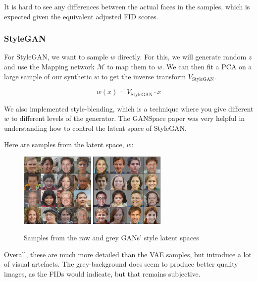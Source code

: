 \documentclass{article}
\begin{document}
It is hard to see any differences between the actual faces in the samples, which is expected given the equivalent adjusted FID scores.

\subsubsection*{StyleGAN}

For StyleGAN, we want to sample $w$ directly. For this, we will generate random $z$ and use the Mapping network $\mathcal{M}$ to map them to $w$.
We can then fit a PCA on a large sample of our synthetic $w$ to get the inverse transform $V_{\text{StyleGAN}}$.

\[w(x) = V_{\text{StyleGAN}} \cdot x\]

We also implemented style-blending, which is a technique where you give different $w$ to different levels of the generator.
The GANSpace paper \cite{harkonen2020ganspace} was very helpful in understanding how to control the latent space of StyleGAN.

Here are samples from the latent space, $w$:

\begin{figure}[H]
  \centering
  \includegraphics[width=0.32\textwidth]{images/sample_gan_raw.png}
  \includegraphics[width=0.32\textwidth]{images/sample_gan_grey.png}
  \caption{Samples from the raw and grey GANs' style latent spaces}
\end{figure}

Overall, these are much more detailed than the VAE samples, but introduce a lot of visual artefacts. 
The grey-background does seem to produce better quality images, as the FIDs would indicate, but that remains subjective.
\end{document}
